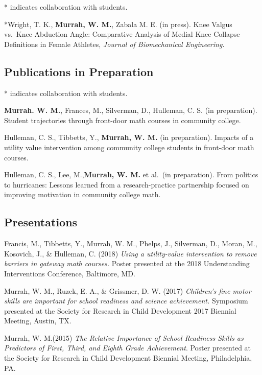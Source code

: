 \documentclass[11pt,]{article}
\begin{document}
* indicates collaboration with students.

*Wright, T. K., \textbf{Murrah, W. M.}, Zabala M. E. (in press). Knee
Valgus vs.~Knee Abduction Angle: Comparative Analysis of Medial Knee
Collapse Definitions in Female Athletes, \emph{Journal of Biomechanical
Engineering}.

\hypertarget{publications-in-preparation}{%
\subsection{Publications in
Preparation}\label{publications-in-preparation}}

* indicates collaboration with students.

\textbf{Murrah. W. M.}, Frances, M., Silverman, D., Hulleman, C. S. (in
preparation). Student trajectories through front-door math courses in
community college.

Hulleman, C. S., Tibbetts, Y., \textbf{Murrah, W. M.} (in preparation).
Impacts of a utility value intervention among community college students
in front-door math courses.

Hulleman, C. S., Lee, M.,\textbf{Murrah, W. M.} et al.~(in preparation).
From politics to hurricanes: Lessons learned from a research-practice
partnership focused on improving motivation in community college math.

\hypertarget{presentations}{%
\subsection{Presentations}\label{presentations}}

Francis, M., Tibbetts, Y., Murrah, W. M., Phelps, J., Silverman, D.,
Moran, M., Kosovich, J., \& Hulleman, C. (2018) \emph{Using a
utility-value intervention to remove barriers in gateway math courses.}
Poster presented at the 2018 Understanding Interventions Conference,
Baltimore, MD.

Murrah, W. M., Ruzek, E. A., \& Grissmer, D. W. (2017) \emph{Children's
fine motor skills are important for school readiness and science
achievement.} Symposium presented at the Society for Research in Child
Development 2017 Biennial Meeting, Austin, TX.

Murrah, W. M.(2015) \emph{The Relative Importance of School Readiness
Skills as Predictors of First, Third, and Eighth Grade Achievement}.
Poster presented at the Society for Research in Child Development
Biennial Meeting, Philadelphia, PA.
\end{document}
